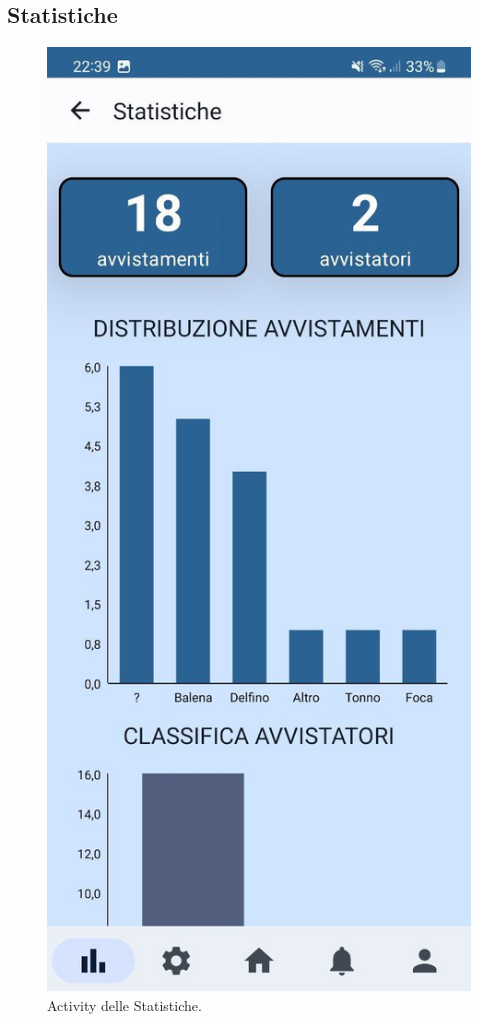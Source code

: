 \documentclass[a4paper,final,12pt]{report}
\begin{document}
\subsection{Statistiche}
\begin{figure}[hbtp]
\centering
\includegraphics[scale=0.20]{img_concettuale/statmob.jpg}
\caption{Activity delle Statistiche.}
\end{figure}
\end{document}
